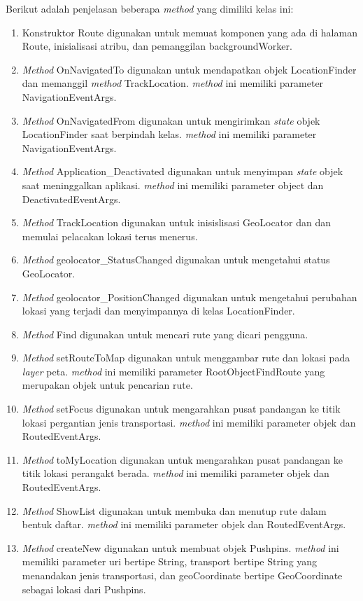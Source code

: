 Berikut adalah penjelasan beberapa \textit{method} yang dimiliki kelas ini:
\begin{enumerate}
	\item Konstruktor Route digunakan untuk memuat komponen yang ada di halaman Route, inisialisasi atribu, dan pemanggilan backgroundWorker.
	\item \textit{Method} OnNavigatedTo digunakan untuk mendapatkan objek LocationFinder dan memanggil \textit{method} TrackLocation. \textit{method} ini memiliki parameter NavigationEventArgs.
	\item \textit{Method} OnNavigatedFrom digunakan untuk mengirimkan \textit{state} objek LocationFinder saat berpindah kelas. \textit{method} ini memiliki parameter NavigationEventArgs.
	\item \textit{Method} Application\_Deactivated digunakan untuk menyimpan \textit{state} objek saat meninggalkan aplikasi. \textit{method} ini memiliki parameter object dan DeactivatedEventArgs.
	\item \textit{Method} TrackLocation digunakan untuk inisislisasi GeoLocator dan dan memulai pelacakan lokasi terus menerus. 
	\item \textit{Method} geolocator\_StatusChanged digunakan untuk mengetahui status GeoLocator.
	\item \textit{Method} geolocator\_PositionChanged digunakan untuk mengetahui perubahan lokasi yang terjadi dan menyimpannya di kelas LocationFinder.
	\item \textit{Method} Find digunakan untuk mencari rute yang dicari pengguna.
	\item \textit{Method} setRouteToMap digunakan untuk menggambar rute dan lokasi pada \textit{layer} peta. \textit{method} ini memiliki parameter RootObjectFindRoute yang merupakan objek untuk pencarian rute.
	\item \textit{Method} setFocus digunakan untuk mengarahkan pusat pandangan ke titik lokasi pergantian jenis transportasi. \textit{method} ini memiliki parameter objek dan RoutedEventArgs.
	\item \textit{Method} toMyLocation digunakan untuk mengarahkan pusat pandangan ke titik lokasi perangakt berada. \textit{method} ini memiliki parameter objek dan RoutedEventArgs.
	\item \textit{Method} ShowList digunakan untuk membuka dan menutup rute dalam bentuk daftar. \textit{method} ini memiliki parameter objek dan RoutedEventArgs.
	\item \textit{Method} createNew digunakan untuk membuat objek Pushpins. \textit{method} ini memiliki parameter uri bertipe String, transport bertipe String yang menandakan jenis transportasi, dan geoCoordinate bertipe GeoCoordinate sebagai lokasi dari Pushpins.

\end{enumerate}
